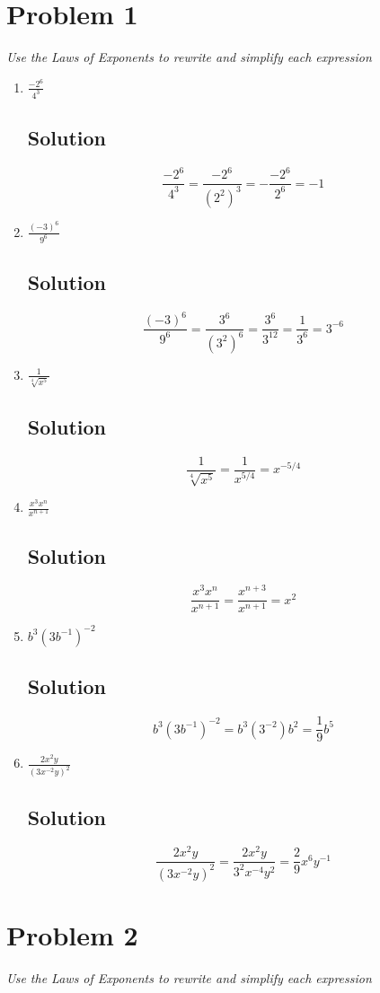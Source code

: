 \documentclass[11pt]{article}
\newcommand{\soln}{\subsection*}
\newcommand{\qn}{\textit}
\begin{document}
\section*{Problem 1}

\qn{Use the Laws of Exponents to rewrite and simplify each expression}

\begin{enumerate}
	\item \qn{$\frac{-2^6}{4^3}$}
	\soln{Solution}
	$$\frac{-2^6}{4^3}=\frac{-2^6}{(2^2)^3}=-\frac{-2^6}{2^6}=-1$$
	
	\item \qn{$\frac{(-3)^6}{9^6}$}
	\soln{Solution}
	$$\frac{(-3)^6}{9^6}=\frac{3^6}{(3^2)^6}=\frac{3^6}{3^{12}}=\frac{1}{3^6}=3^{-6}$$
	
	\item \qn{$\frac{1}{\sqrt[4]{x^5}}$}
	\soln{Solution}
	$$\frac{1}{\sqrt[4]{x^5}}=\frac{1}{x^{5/4}}=x^{-5/4}$$
	
	\item \qn{$\frac{x^3x^n}{x^{n+1}}$}
	\soln{Solution}
	$$\frac{x^3x^n}{x^{n+1}}=\frac{x^{n+3}}{x^{n+1}}=x^2$$
	
	\item \qn{$b^3(3b^{-1})^{-2}$}
	\soln{Solution}
	$$b^3(3b^{-1})^{-2}=b^3(3^{-2})b^2=\frac{1}{9}b^5$$
	
	\item \qn{$\frac{2x^2y}{(3x^{-2}y)^2}$}
	\soln{Solution}
	$$\frac{2x^2y}{(3x^{-2}y)^2}=\frac{2x^2y}{3^2x^{-4}y^2}=\frac{2}{9}x^6y^{-1}$$
\end{enumerate}

\section*{Problem 2}

\qn{Use the Laws of Exponents to rewrite and simplify each expression}
\end{document}
